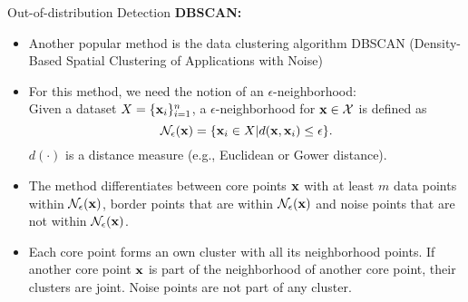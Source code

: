 \documentclass[11pt,compress,t,notes=noshow, aspectratio=169, xcolor=table]{beamer}
\begin{document}
\begin{frame}{Out-of-distribution Detection}
\textbf{DBSCAN:}
\begin{itemize}
	\item Another popular method is the data clustering algorithm DBSCAN (Density-Based Spatial Clustering of Applications with Noise) 
	\item For this method, we need the notion of an $\epsilon$-neighborhood: \\
	Given a dataset $X = \{\mathbf{x}_i\}_{i = 1}^n$, a $\epsilon$-neighborhood for $\mathbf{x} \in \mathcal{X}$ is defined as 
	$$ \mathcal{N}_{\epsilon}(\mathbf{x}) = \{\mathbf{x}_i \in X | d(\mathbf{x}, \mathbf{x}_i) \le \epsilon\}.$$
	 $d(\cdot)$ is a distance measure (e.g., Euclidean or Gower distance). 
	\item The method differentiates between core points $\mathbf{x}$ with at least $m$ data points within $\mathcal{N}_{\epsilon}(\mathbf{x})$, border points that are within $\mathcal{N}_{\epsilon}(\mathbf{x})$ and noise points that are not within $\mathcal{N}_{\epsilon}(\mathbf{x})$.
	\item Each core point forms an own cluster with all its neighborhood points. If another core point $\mathbf{x}$ is part of the neighborhood of another core point, their clusters are joint. Noise points are not part of any cluster. 
\end{itemize}
\vspace{-0.6cm}
\end{frame}
\end{document}
